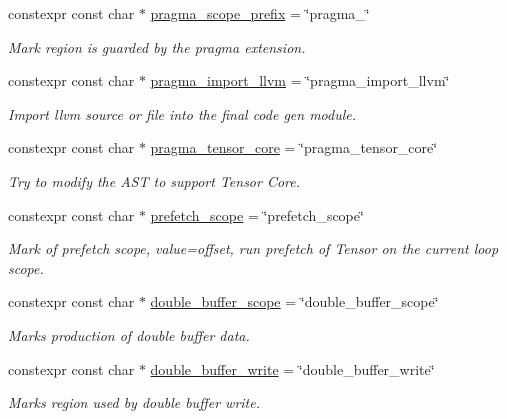 \begin{DoxyCompactItemize}
constexpr const char $\ast$ \hyperlink{namespacetvm_1_1tir_1_1attr_af08d3d2b645a914f1a64d81e45f3b86a}{pragma\+\_\+scope\+\_\+prefix} = \char`\"{}pragma\+\_\+\char`\"{}
\begin{DoxyCompactList}\small\item\em Mark region is guarded by the pragma extension. \end{DoxyCompactList}\item 
constexpr const char $\ast$ \hyperlink{namespacetvm_1_1tir_1_1attr_af00ba402645b1def7c543af3c48be80d}{pragma\+\_\+import\+\_\+llvm} = \char`\"{}pragma\+\_\+import\+\_\+llvm\char`\"{}
\begin{DoxyCompactList}\small\item\em Import llvm source or file into the final code gen module. \end{DoxyCompactList}\item 
constexpr const char $\ast$ \hyperlink{namespacetvm_1_1tir_1_1attr_a96774004fd5b6411f6c37b8923b71834}{pragma\+\_\+tensor\+\_\+core} = \char`\"{}pragma\+\_\+tensor\+\_\+core\char`\"{}
\begin{DoxyCompactList}\small\item\em Try to modify the A\+ST to support Tensor Core. \end{DoxyCompactList}\item 
constexpr const char $\ast$ \hyperlink{namespacetvm_1_1tir_1_1attr_ac95fbd1c09a60b10c7a5d07f6c4b68a6}{prefetch\+\_\+scope} = \char`\"{}prefetch\+\_\+scope\char`\"{}
\begin{DoxyCompactList}\small\item\em Mark of prefetch scope, value=offset, run prefetch of Tensor on the current loop scope. \end{DoxyCompactList}\item 
constexpr const char $\ast$ \hyperlink{namespacetvm_1_1tir_1_1attr_a9231fc0afe37a8d46a90a1c5fdf522bb}{double\+\_\+buffer\+\_\+scope} = \char`\"{}double\+\_\+buffer\+\_\+scope\char`\"{}
\begin{DoxyCompactList}\small\item\em Marks production of double buffer data. \end{DoxyCompactList}\item 
constexpr const char $\ast$ \hyperlink{namespacetvm_1_1tir_1_1attr_af84871a6d841168f8501f141676dfaeb}{double\+\_\+buffer\+\_\+write} = \char`\"{}double\+\_\+buffer\+\_\+write\char`\"{}
\begin{DoxyCompactList}\small\item\em Marks region used by double buffer write. \end{DoxyCompactList}\item 

\end{DoxyCompactItemize}
